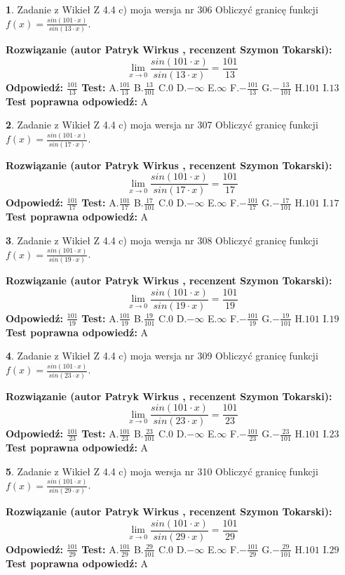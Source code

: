 \documentclass[12pt, a4paper]{article}
\theoremstyle{definition} %
\newtheorem{zad}{}
\newcommand{\zadStart}[1]{\begin{zad}#1\newline}
\newcommand{\zadStop}{\end{zad}}
\newcommand{\rozwStart}[2]{\noindent \textbf{Rozwiązanie (autor #1 , recenzent #2): }\newline}
\newcommand{\rozwStop}{\newline}
\newcommand{\odpStart}{\noindent \textbf{Odpowiedź:}\newline}
\newcommand{\odpStop}{\newline}
\newcommand{\testStart}{\noindent \textbf{Test:}\newline}
\newcommand{\testStop}{\newline}
\newcommand{\kluczStart}{\noindent \textbf{Test poprawna odpowiedź:}\newline}
\newcommand{\kluczStop}{\newline}
\begin{document}
\zadStart{Zadanie z Wikieł Z 4.4 c) moja wersja nr 306}
Obliczyć granicę funkcji $f(x)=\frac{sin(101\cdot x)}{sin(13\cdot x)}$.
\zadStop
\rozwStart{Patryk Wirkus}{Szymon Tokarski}
$$\lim\limits_{x\to 0}\frac{sin(101\cdot x)}{sin(13\cdot x)}=
\frac{101}{13}$$
\rozwStop
\odpStart
$\frac{101}{13}$
\odpStop
\testStart
A.$\frac{101}{13}$
B.$\frac{13}{101}$
C.$0$
D.$-\infty$
E.$\infty$
F.$-\frac{101}{13}$
G.$-\frac{13}{101}$
H.$101$
I.$13$
\testStop
\kluczStart
A
\kluczStop



\zadStart{Zadanie z Wikieł Z 4.4 c) moja wersja nr 307}
Obliczyć granicę funkcji $f(x)=\frac{sin(101\cdot x)}{sin(17\cdot x)}$.
\zadStop
\rozwStart{Patryk Wirkus}{Szymon Tokarski}
$$\lim\limits_{x\to 0}\frac{sin(101\cdot x)}{sin(17\cdot x)}=
\frac{101}{17}$$
\rozwStop
\odpStart
$\frac{101}{17}$
\odpStop
\testStart
A.$\frac{101}{17}$
B.$\frac{17}{101}$
C.$0$
D.$-\infty$
E.$\infty$
F.$-\frac{101}{17}$
G.$-\frac{17}{101}$
H.$101$
I.$17$
\testStop
\kluczStart
A
\kluczStop



\zadStart{Zadanie z Wikieł Z 4.4 c) moja wersja nr 308}
Obliczyć granicę funkcji $f(x)=\frac{sin(101\cdot x)}{sin(19\cdot x)}$.
\zadStop
\rozwStart{Patryk Wirkus}{Szymon Tokarski}
$$\lim\limits_{x\to 0}\frac{sin(101\cdot x)}{sin(19\cdot x)}=
\frac{101}{19}$$
\rozwStop
\odpStart
$\frac{101}{19}$
\odpStop
\testStart
A.$\frac{101}{19}$
B.$\frac{19}{101}$
C.$0$
D.$-\infty$
E.$\infty$
F.$-\frac{101}{19}$
G.$-\frac{19}{101}$
H.$101$
I.$19$
\testStop
\kluczStart
A
\kluczStop



\zadStart{Zadanie z Wikieł Z 4.4 c) moja wersja nr 309}
Obliczyć granicę funkcji $f(x)=\frac{sin(101\cdot x)}{sin(23\cdot x)}$.
\zadStop
\rozwStart{Patryk Wirkus}{Szymon Tokarski}
$$\lim\limits_{x\to 0}\frac{sin(101\cdot x)}{sin(23\cdot x)}=
\frac{101}{23}$$
\rozwStop
\odpStart
$\frac{101}{23}$
\odpStop
\testStart
A.$\frac{101}{23}$
B.$\frac{23}{101}$
C.$0$
D.$-\infty$
E.$\infty$
F.$-\frac{101}{23}$
G.$-\frac{23}{101}$
H.$101$
I.$23$
\testStop
\kluczStart
A
\kluczStop



\zadStart{Zadanie z Wikieł Z 4.4 c) moja wersja nr 310}
Obliczyć granicę funkcji $f(x)=\frac{sin(101\cdot x)}{sin(29\cdot x)}$.
\zadStop
\rozwStart{Patryk Wirkus}{Szymon Tokarski}
$$\lim\limits_{x\to 0}\frac{sin(101\cdot x)}{sin(29\cdot x)}=
\frac{101}{29}$$
\rozwStop
\odpStart
$\frac{101}{29}$
\odpStop
\testStart
A.$\frac{101}{29}$
B.$\frac{29}{101}$
C.$0$
D.$-\infty$
E.$\infty$
F.$-\frac{101}{29}$
G.$-\frac{29}{101}$
H.$101$
I.$29$
\testStop
\kluczStart
A
\kluczStop
\end{document}
